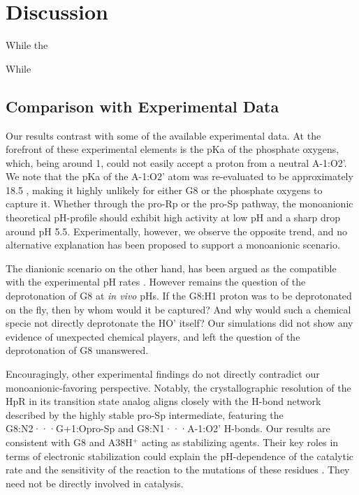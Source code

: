 \documentclass[journal=jacsat,manuscript=article]{achemso}
\begin{document}
\section{Discussion}

While the 

While 


\subsection{Comparison with Experimental Data}

Our results contrast with some of the available experimental data.
At the forefront of these experimental elements is the pKa of the phosphate oxygens,
which, being around 1, could not easily accept a proton from a neutral A-1:O2'.
We note that the pKa of the A-1:O2' atom was re-evaluated to be approximately 18.5 \cite{veenis_investigation_2021},
making it highly unlikely for either G8 or the phosphate oxygens to capture it.
Whether through the pro-Rp or the pro-Sp pathway, the monoanionic theoretical pH-profile
should exhibit high activity at low pH and a sharp drop around pH 5.5.
Experimentally, however, we observe the opposite trend,
and no alternative explanation has been proposed to support a monoanionic scenario.

The dianionic scenario on the other hand, has been argued 
as the compatible with the experimental pH rates \cite{kath-schorr_general_2012,wilson_hairpin_2011}. 
However remains the question of the deprotonation of G8 at \textit{in vivo} pHs. 
If the G8:H1 proton was to be deprotonated on the fly, then by whom would it be captured? 
And why would such a chemical specie not directly deprotonate the HO' itself? 
Our simulations did not show any evidence of unexpected chemical players, 
and left the question of the deprotonation of G8 unanswered.

Encouragingly, other experimental findings do not directly contradict our monoanionic-favoring perspective.
Notably, the crystallographic resolution of the \acrshort{HpR} in its transition state analog \cite{torelli_comparison_2007}
aligns closely with the H-bond network described by the highly stable pro-Sp intermediate,
featuring the G8:N2···G+1:Opro-Sp and G8:N1···A-1:O2' H-bonds.
Our results are consistent with G8 and A38H$^+$ acting as stabilizing agents.
Their key roles in terms of electronic stabilization 
could explain the pH-dependence of the catalytic rate \cite{lebruska_rescue_2002, bevilacqua_mechanistic_2003, kuzmin_role_2004, nahas_observation_2004, wilson_nucleobase_2006, wilson_hairpin_2011} 
and the sensitivity of the reaction to the mutations of these residues \cite{mlynsky_extensive_2010, mlynsky_reactive_2015}. 
They need not be directly involved in catalysis.
\end{document}

